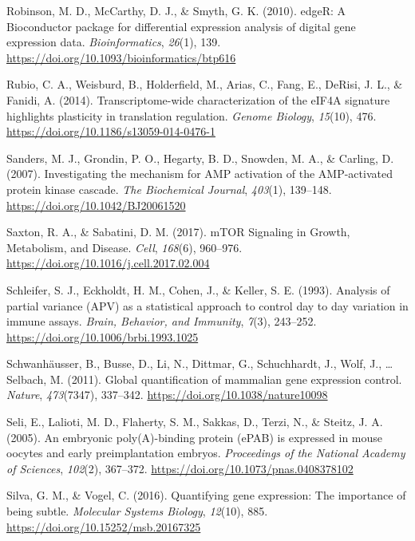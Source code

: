 \documentclass[12pt,openany]{book}
\begin{document}
\hypertarget{ref-Robinson2010}{}
Robinson, M. D., McCarthy, D. J., \& Smyth, G. K. (2010). edgeR: A
Bioconductor package for differential expression analysis of digital
gene expression data. \emph{Bioinformatics}, \emph{26}(1), 139.
\url{https://doi.org/10.1093/bioinformatics/btp616}

\hypertarget{ref-Rubio2014}{}
Rubio, C. A., Weisburd, B., Holderfield, M., Arias, C., Fang, E.,
DeRisi, J. L., \& Fanidi, A. (2014). Transcriptome-wide characterization
of the eIF4A signature highlights plasticity in translation regulation.
\emph{Genome Biology}, \emph{15}(10), 476.
\url{https://doi.org/10.1186/s13059-014-0476-1}

\hypertarget{ref-Sanders2007}{}
Sanders, M. J., Grondin, P. O., Hegarty, B. D., Snowden, M. A., \&
Carling, D. (2007). Investigating the mechanism for AMP activation of
the AMP-activated protein kinase cascade. \emph{The Biochemical
Journal}, \emph{403}(1), 139--148.
\url{https://doi.org/10.1042/BJ20061520}

\hypertarget{ref-Saxton2017}{}
Saxton, R. A., \& Sabatini, D. M. (2017). mTOR Signaling in Growth,
Metabolism, and Disease. \emph{Cell}, \emph{168}(6), 960--976.
\url{https://doi.org/10.1016/j.cell.2017.02.004}

\hypertarget{ref-Schleifer1993}{}
Schleifer, S. J., Eckholdt, H. M., Cohen, J., \& Keller, S. E. (1993).
Analysis of partial variance (APV) as a statistical approach to control
day to day variation in immune assays. \emph{Brain, Behavior, and
Immunity}, \emph{7}(3), 243--252.
\url{https://doi.org/10.1006/brbi.1993.1025}

\hypertarget{ref-Schwanhausser2011}{}
Schwanhäusser, B., Busse, D., Li, N., Dittmar, G., Schuchhardt, J.,
Wolf, J., \ldots{} Selbach, M. (2011). Global quantification of
mammalian gene expression control. \emph{Nature}, \emph{473}(7347),
337--342. \url{https://doi.org/10.1038/nature10098}

\hypertarget{ref-Seli2005}{}
Seli, E., Lalioti, M. D., Flaherty, S. M., Sakkas, D., Terzi, N., \&
Steitz, J. A. (2005). An embryonic poly(A)-binding protein (ePAB) is
expressed in mouse oocytes and early preimplantation embryos.
\emph{Proceedings of the National Academy of Sciences}, \emph{102}(2),
367--372. \url{https://doi.org/10.1073/pnas.0408378102}

\hypertarget{ref-Silva2016}{}
Silva, G. M., \& Vogel, C. (2016). Quantifying gene expression: The
importance of being subtle. \emph{Molecular Systems Biology},
\emph{12}(10), 885. \url{https://doi.org/10.15252/msb.20167325}
\end{document}
